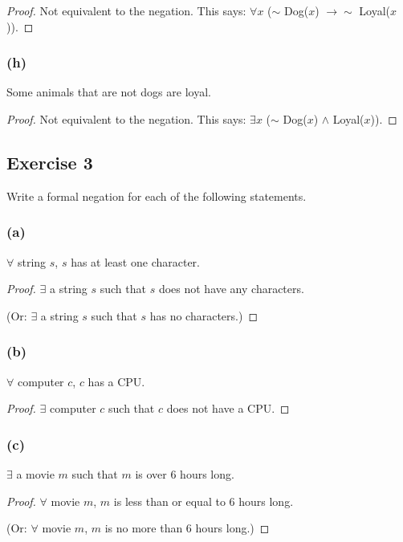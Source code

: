\documentclass[14pt]{extarticle}
\newcommand{\fa}{\forall}
\newcommand{\te}{\exists}
\begin{document}
\begin{proof}
    Not equivalent to the negation. This says: $\fa x$ ($\sim$ Dog($x$) $\to\sim$ Loyal($x$)).
\end{proof}

\subsubsection{(h)}
Some animals that are not dogs are loyal.

\begin{proof}
    Not equivalent to the negation. This says: $\te x$ ($\sim$ Dog($x$) $\wedge$ Loyal($x$)).
\end{proof}

\subsection{Exercise 3}
Write a formal negation for each of the following statements.

\subsubsection{(a)}
$\fa$ string $s$, $s$ has at least one character.

\begin{proof}
    $\te$ a string $s$ such that $s$ does not have any characters.

    (Or: $\te$ a string $s$ such that $s$ has no characters.)
\end{proof}

\subsubsection{(b)}
$\fa$ computer $c$, $c$ has a CPU.

\begin{proof}
    $\te$ computer $c$ such that $c$ does not have a CPU.
\end{proof}

\subsubsection{(c)}
$\te$ a movie $m$ such that $m$ is over 6 hours long.

\begin{proof}
    $\fa$ movie $m$, $m$ is less than or equal to 6 hours long.

    (Or: $\fa$ movie $m$, $m$ is no more than 6 hours long.)
\end{proof}
\end{document}
